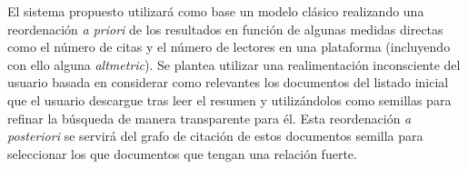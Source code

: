 El sistema propuesto utilizará como base un modelo clásico realizando una reordenación \textit{a priori} de los resultados en función de algunas medidas directas como el número de citas y el número de lectores en una plataforma (incluyendo con ello alguna \textit{altmetric}). Se plantea utilizar una realimentación inconsciente del usuario basada en considerar como relevantes los documentos del listado inicial que el usuario descargue tras leer el resumen y utilizándolos como semillas para refinar la búsqueda de manera transparente para él. Esta reordenación  \textit{a posteriori} se servirá del grafo de citación de estos documentos semilla para seleccionar los que documentos que tengan una relación fuerte.




